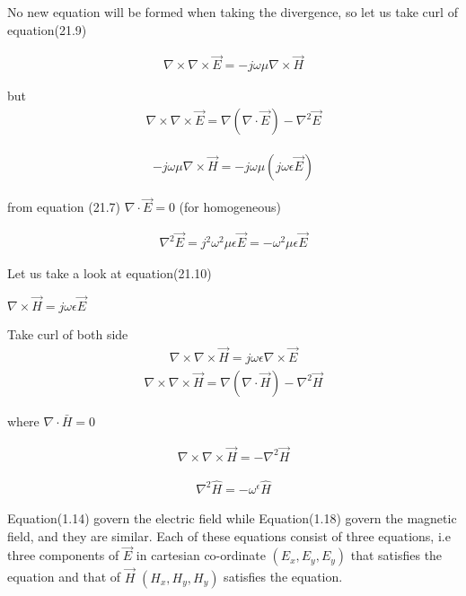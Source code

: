 		\bigskip
		
		No new equation will be formed when taking the divergence, so let us take curl of equation(21.9)
		
		\bigskip
		\begin{align}
		\nabla\times\nabla\times\vec{E}=-j\omega\mu\nabla\times\vec{H}
		\end{align}
		
		
		\bigskip
		
		but 
		\begin{align}
		\nabla\times\nabla\times\vec{E}=\nabla(\nabla\cdot\vec{E}) - \nabla^2\vec{E}
		\end{align}
		
		\begin{align}
		-j\omega\mu\nabla\times \vec{H}=-j\omega\mu(j\omega\epsilon\vec{E})
		\end{align}
		
		
		\bigskip
		
		from equation (21.7) $\nabla\cdot\vec{E}=0$ (for homogeneous)
		
		
		\begin{align}
		\nabla^2\vec{E}=j^2\omega^2\mu\epsilon\vec{E}=-\omega^2\mu\epsilon\vec{E}
		\end{align}
		
		
		\bigskip
		
		Let us take a look at equation(21.10)
		
		$\nabla\times\vec{H}=j\omega\epsilon\vec{E}$
		
		\bigskip
		
		Take curl of both side
		\begin{align}
		\nabla\times\nabla\times\vec{H}=j\omega\epsilon\nabla\times\vec{E}
		\end{align}
		\begin{align}
		\nabla\times\nabla\times\vec{H}=\nabla(\nabla\cdot\vec{H})-\nabla^2\vec{H}
		\end{align}
		
		where $\nabla\cdot\bar{H}=0$
		
		\begin{align}
		\nabla\times\nabla\times\vec{H}=-\nabla^2\vec{H}
		\end{align}
		\bigskip
		
		\begin{align}
		\nabla^2 \hat{H}=-\omega^\epsilon \hat{H}
		\end{align}
		
		Equation(1.14) govern the electric field while  Equation(1.18) govern the magnetic field, and they are similar. Each of these equations consist of three equations, i.e three components of $\vec{E}$ in cartesian co-ordinate $(E_{x},E_{y},E_{y})$ that satisfies the equation and that of  $\vec{H}$ $(H_{x},H_{y},H_{y})$ satisfies the equation.
		
